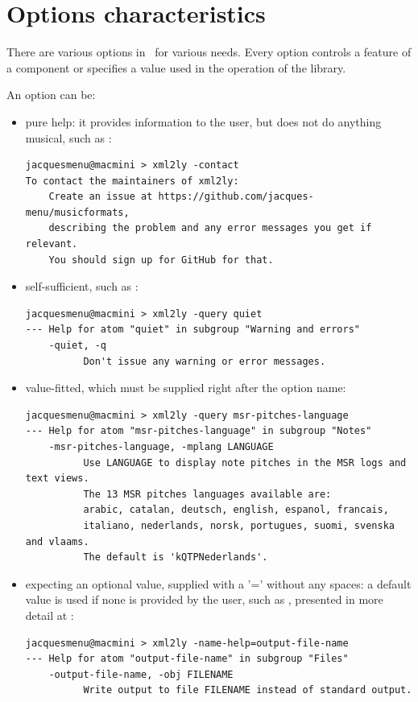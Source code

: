 \section{Options characteristics}\label{Options characteristics}

There are various options in \mf\ for various needs. Every option controls a feature of a component or specifies a value used in the operation of the library.

An option can be:
\begin{itemize}
\item pure help:
it provides information to the user, but does not do anything musical, such as :
\begin{lstlisting}[language=Terminal]
jacquesmenu@macmini > xml2ly -contact
To contact the maintainers of xml2ly:
    Create an issue at https://github.com/jacques-menu/musicformats,
    describing the problem and any error messages you get if relevant.
    You should sign up for GitHub for that.
\end{lstlisting}

\item self-sufficient, such as :
\begin{lstlisting}[language=Terminal]
jacquesmenu@macmini > xml2ly -query quiet
--- Help for atom "quiet" in subgroup "Warning and errors"
    -quiet, -q
          Don't issue any warning or error messages.
\end{lstlisting}

\item value-fitted, which must be supplied right after the option name:
\begin{lstlisting}[language=Terminal]
jacquesmenu@macmini > xml2ly -query msr-pitches-language
--- Help for atom "msr-pitches-language" in subgroup "Notes"
    -msr-pitches-language, -mplang LANGUAGE
          Use LANGUAGE to display note pitches in the MSR logs and text views.
          The 13 MSR pitches languages available are:
          arabic, catalan, deutsch, english, espanol, francais,
          italiano, nederlands, norsk, portugues, suomi, svenska and vlaams.
          The default is 'kQTPNederlands'.
\end{lstlisting}

\item expecting an optional value, supplied with a '=' without any spaces:
a default value is used if none is provided by the user, such as , presented in more detail at :
\begin{lstlisting}[language=Terminal]
jacquesmenu@macmini > xml2ly -name-help=output-file-name
--- Help for atom "output-file-name" in subgroup "Files"
    -output-file-name, -obj FILENAME
          Write output to file FILENAME instead of standard output.
\end{lstlisting}

\end{itemize}

